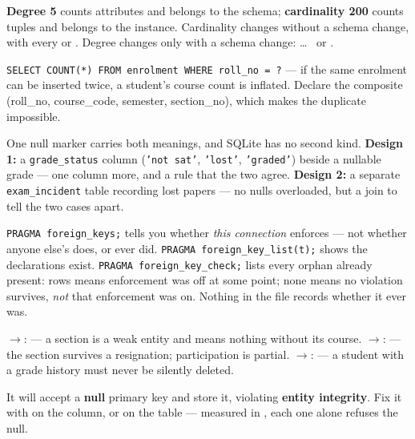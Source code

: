 \begin{ans}
  \item \textbf{Degree 5} counts attributes and belongs to the schema;
        \textbf{cardinality 200} counts tuples and belongs to the instance.
        Cardinality changes without a schema change, with every
         or . Degree changes only with a schema
        change:  \dots\  or .
  \item \texttt{SELECT COUNT(*) FROM enrolment WHERE roll\_no = ?} --- if the
        same enrolment can be inserted twice, a student's course count is
        inflated. Declare the composite  (roll\_no,
        course\_code, semester, section\_no), which makes the duplicate
        impossible.
  \item One null marker carries both meanings, and SQLite has no second kind.
        \textbf{Design 1:} a \texttt{grade\_status} column (\texttt{'not sat'},
        \texttt{'lost'}, \texttt{'graded'}) beside a nullable grade --- one
        column more, and a rule that the two agree. \textbf{Design 2:} a
        separate \texttt{exam\_incident} table recording lost papers --- no
        nulls overloaded, but a join to tell the two cases apart.
\end{ans}

\begin{ans}
  \item \texttt{PRAGMA foreign\_keys;} tells you whether \emph{this
        connection} enforces --- not whether anyone else's does, or ever did.
        \texttt{PRAGMA foreign\_key\_list(t);} shows the declarations exist.
        \texttt{PRAGMA foreign\_key\_check;} lists every orphan already
        present: rows means enforcement was off at some point; none means no
        violation survives, \emph{not} that enforcement was on. Nothing in the
        file records whether it ever was.
  \item {}$\rightarrow$:  --- a
        section is a weak entity and means nothing without its course.
        $\rightarrow$:  --- the
        section survives a resignation; participation is partial.
        $\rightarrow$:  --- a
        student with a grade history must never be silently deleted.
  \item It will accept a \textbf{null} primary key and store it, violating
        \textbf{entity integrity}. Fix it with  on the column,
        or  on the table --- measured in ,
        each one alone refuses the null.
\end{ans}

